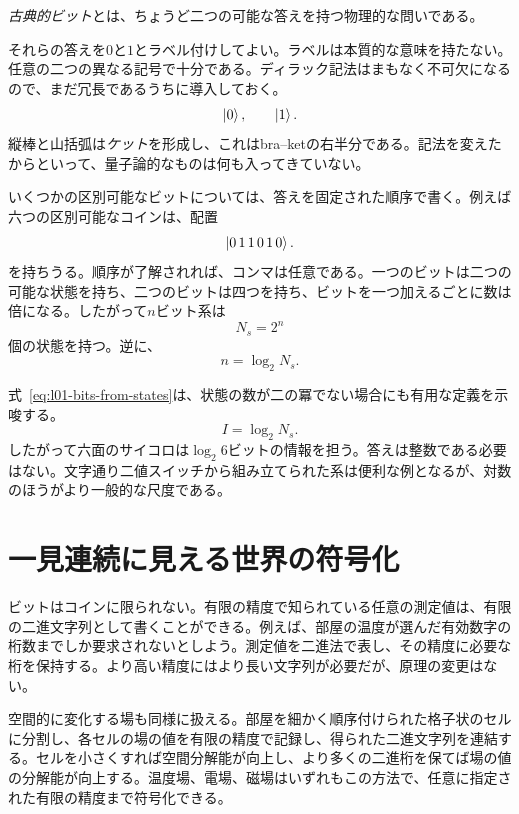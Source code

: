 \begin{definition}
\emph{古典的ビット}とは、ちょうど二つの可能な答えを持つ物理的な問いである。
\end{definition}

それらの答えを\(0\)と\(1\)とラベル付けしてよい。ラベルは本質的な意味を持たない。任意の二つの異なる記号で十分である。ディラック記法はまもなく不可欠になるので、まだ冗長であるうちに導入しておく。
\begin{equation}
  \left\lvert0\right\rangle,
  \qquad
  \left\lvert1\right\rangle.
\end{equation}
縦棒と山括弧は\emph{ケット}を形成し、これはbra--ketの右半分である。記法を変えたからといって、量子論的なものは何も入ってきていない。

いくつかの区別可能なビットについては、答えを固定された順序で書く。例えば六つの区別可能なコインは、配置
\begin{equation}
  \left\lvert0\,1\,1\,0\,1\,0\right\rangle.
\end{equation}
を持ちうる。順序が了解されれば、コンマは任意である。一つのビットは二つの可能な状態を持ち、二つのビットは四つを持ち、ビットを一つ加えるごとに数は倍になる。したがって\(n\)ビット系は
\begin{equation}
  N_s=2^n
  \label{eq:l01-state-count}
\end{equation}
個の状態を持つ。逆に、
\begin{equation}
  n=\log_2 N_s.
  \label{eq:l01-bits-from-states}
\end{equation}

式~\eqref{eq:l01-bits-from-states}は、状態の数が二の冪でない場合にも有用な定義を示唆する。
\begin{equation}
  I=\log_2 N_s.
  \label{eq:l01-information}
\end{equation}
したがって六面のサイコロは\(\log_2 6\)ビットの情報を担う。答えは整数である必要はない。文字通り二値スイッチから組み立てられた系は便利な例となるが、対数のほうがより一般的な尺度である。

\section{一見連続に見える世界の符号化}

ビットはコインに限られない。有限の精度で知られている任意の測定値は、有限の二進文字列として書くことができる。例えば、部屋の温度が選んだ有効数字の桁数までしか要求されないとしよう。測定値を二進法で表し、その精度に必要な桁を保持する。より高い精度にはより長い文字列が必要だが、原理の変更はない。

空間的に変化する場も同様に扱える。部屋を細かく順序付けられた格子状のセルに分割し、各セルの場の値を有限の精度で記録し、得られた二進文字列を連結する。セルを小さくすれば空間分解能が向上し、より多くの二進桁を保てば場の値の分解能が向上する。温度場、電場、磁場はいずれもこの方法で、任意に指定された有限の精度まで符号化できる。

